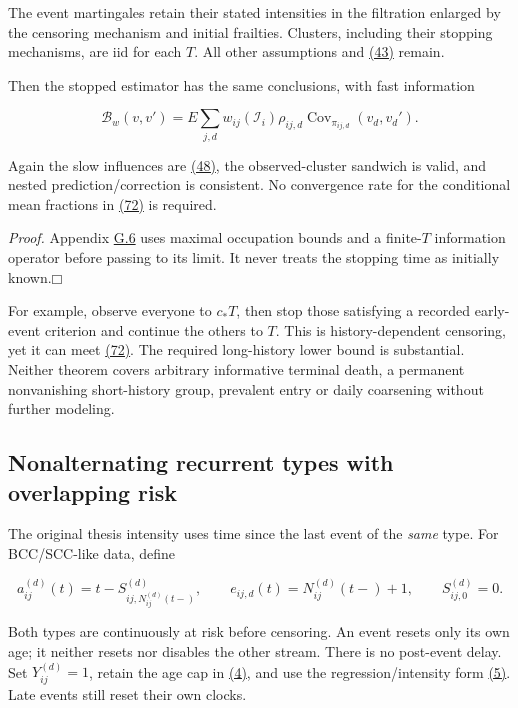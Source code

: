 \documentclass[11pt]{article}
\providecommand{\square}{\mdlgwhtsquare}
\begin{document}
The event martingales retain their stated intensities in the filtration enlarged by the censoring mechanism and initial frailties. Clusters, including their stopping mechanisms, are iid for each \(T\). All other assumptions and \hyperref[eq:43]{(43)} remain.

Then the stopped estimator has the same conclusions, with fast information

\begin{equation*}
\mathcal B_w(v,v')=E\sum_{j,d}w_{ij}(\mathcal I_i)\rho_{ij,d}
 \operatorname{Cov}_{\pi_{ij,d}}(v_d,v_d').
\tag{73}\label{eq:73}
\end{equation*}

Again the slow influences are \hyperref[eq:48]{(48)}, the observed-cluster sandwich is valid, and nested prediction/correction is consistent. No convergence rate for the conditional mean fractions in \hyperref[eq:72]{(72)} is required.

\textit{Proof.} Appendix \hyperref[sec:G.6]{G.6} uses maximal occupation bounds and a finite-\(T\) information operator before passing to its limit. It never treats the stopping time as initially known.\hfill$\square$

For example, observe everyone to \(c_*T\), then stop those satisfying a recorded early-event criterion and continue the others to \(T\). This is history-dependent censoring, yet it can meet \hyperref[eq:72]{(72)}. The required long-history lower bound is substantial. Neither theorem covers arbitrary informative terminal death, a permanent nonvanishing short-history group, prevalent entry or daily coarsening without further modeling.

\subsection{Nonalternating recurrent types with overlapping risk}\label{sec:5.5}

The original thesis intensity uses time since the last event of the \emph{same} type. For BCC/SCC-like data, define

\begin{equation*}
a_{ij}^{(d)}(t)=t-S_{ij,N_{ij}^{(d)}(t-)}^{(d)},\qquad
e_{ij,d}(t)=N_{ij}^{(d)}(t-)+1,\qquad S_{ij,0}^{(d)}=0 .
\tag{74}\label{eq:74}
\end{equation*}

Both types are continuously at risk before censoring. An event resets only its own age; it neither resets nor disables the other stream. There is no post-event delay. Set \(Y_{ij}^{(d)}=1\), retain the age cap in \hyperref[eq:4]{(4)}, and use the regression/intensity form \hyperref[eq:5]{(5)}. Late events still reset their own clocks.
\end{document}
